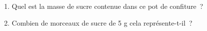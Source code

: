 \documentclass[exercice]{thedocument}%
\begin{document}
%
\begin{minipage}[t]{.5\linewidth}
   \begin{enumerate}
    \item Quel est la masse de sucre contenue dans ce pot de confiture~?
    \item Combien de morceaux de sucre de 5 g cela représente-t-il~?
\end{enumerate} 
\end{minipage}%
\begin{minipage}[t]{.5\linewidth}
\end{minipage}
\end{document}
